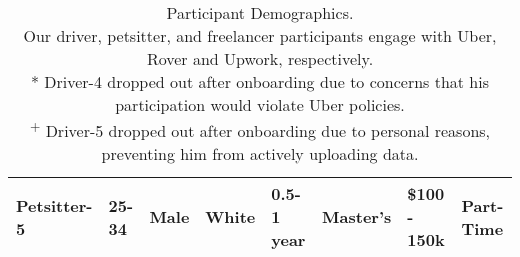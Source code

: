 \begin{table}[]
{\begin{tabular}{|l|l|l|l|l|l|p{1.5cm}|p{1.5cm}|}
Petsitter-5 & 25-34 & Male & White & 0.5-1 year & Master's & \$100 - 150k & Part-Time \\ \hline
\end{tabular}
}
\caption{Participant Demographics. \\
Our driver, petsitter, and freelancer participants engage with Uber, Rover and Upwork, respectively. \\
* Driver-4 dropped out after onboarding due to concerns that his participation would violate Uber policies. \\
\textsuperscript{+} Driver-5 dropped out after onboarding due to personal reasons, preventing him from actively uploading data.}
    \label{participants}
    
\end{table}